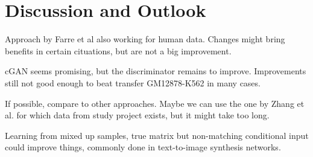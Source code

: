 \section{Discussion and Outlook}
Approach by Farre et al also working for human data.
Changes might bring benefits in certain cituations, but are not a big improvement.

cGAN seems promising, but the discriminator remains to improve.
Improvements still not good enough to beat transfer GM12878-K562 in many cases.

If possible, compare to other approaches. 
Maybe we can use the one by Zhang et al. for which data from study project exists, but it might take too long.

Learning from mixed up samples, true matrix but non-matching conditional input could improve things,
commonly done in text-to-image synthesis networks.
